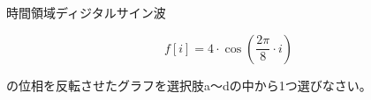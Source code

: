 時間領域ディジタルサイン波 

\[
f[i] = 4 \cdot \cos \left ( \frac{2 \pi}{8}  \cdot i \right )
\]

\noindent の位相を反転させたグラフを選択肢a〜dの中から1つ選びなさい。

